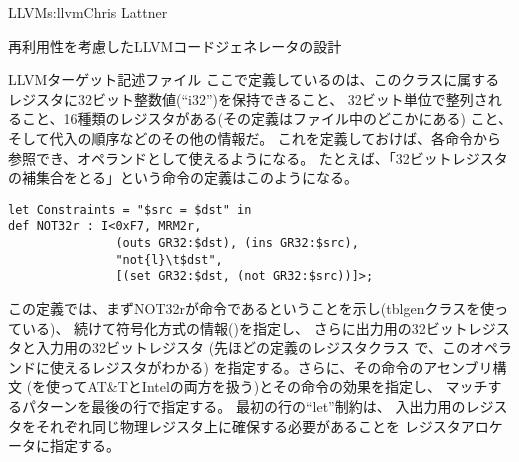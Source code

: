 \begin{aosachapter}{LLVM}{s:llvm}{Chris Lattner}
\begin{aosasect1}{再利用性を考慮したLLVMコードジェネレータの設計}
\begin{aosasect2}{LLVMターゲット記述ファイル}
\noindent
ここで定義しているのは、このクラスに属するレジスタに32ビット整数値(``i32'')を保持できること、
32ビット単位で整列されること、16種類のレジスタがある(その定義はファイル中のどこかにある)
こと、そして代入の順序などのその他の情報だ。
これを定義しておけば、各命令から参照でき、オペランドとして使えるようになる。
たとえば、「32ビットレジスタの補集合をとる」という命令の定義はこのようになる。

\begin{verbatim}
let Constraints = "$src = $dst" in
def NOT32r : I<0xF7, MRM2r,
               (outs GR32:$dst), (ins GR32:$src),
               "not{l}\t$dst",
               [(set GR32:$dst, (not GR32:$src))]>;
\end{verbatim}

\noindent
この定義では、まずNOT32rが命令であるということを示し(tblgenクラスを使っている)、
続けて符号化方式の情報()を指定し、
さらに出力用の32ビットレジスタと入力用の32ビットレジスタ
(先ほどの定義のレジスタクラス
で、このオペランドに使えるレジスタがわかる)
を指定する。さらに、その命令のアセンブリ構文
(\code{\{\}}を使ってAT\&TとIntelの両方を扱う)とその命令の効果を指定し、
マッチするパターンを最後の行で指定する。
最初の行の``let''制約は、
入出力用のレジスタをそれぞれ同じ物理レジスタ上に確保する必要があることを
レジスタアロケータに指定する。


\end{aosasect2}
\end{aosasect1}
\end{aosachapter}
